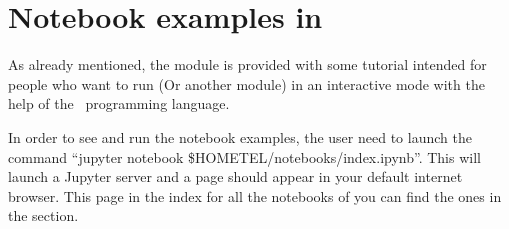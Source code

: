 \section{Notebook examples in \TelApy{}}

As already mentioned, the \TelApy{} module is provided with some tutorial intended
for people who want to run  (Or another module) in an interactive
mode with the help of the \python\ programming language.

In order to see and run the notebook examples, the user need to launch the
command ``jupyter notebook \$HOMETEL/notebooks/index.ipynb''. This will
launch a Jupyter server and a page should appear in your default internet
browser. This page in the index for all the notebooks of \telemacsystem{} you can find
the \TelApy{} ones in the \TelApy{} section.
